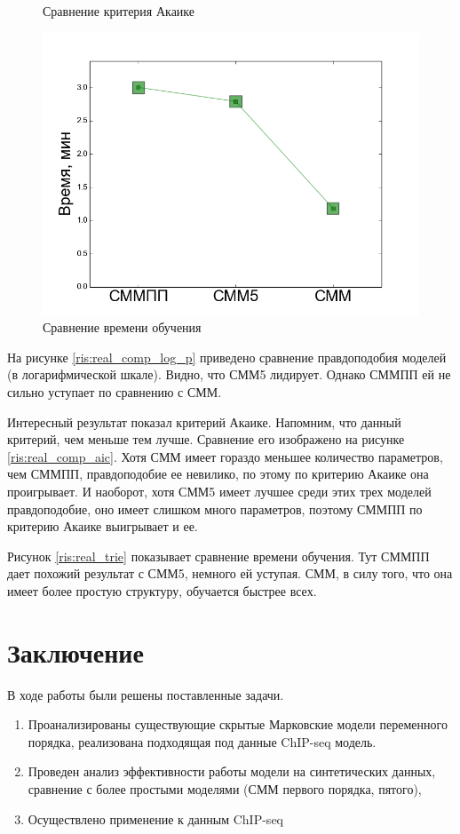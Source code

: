 \documentclass{matmex-diploma-custom}
\begin{document}
\begin{figure}[h!]
\begin{minipage}[b]{0.32 \textwidth}
	\centering
	\caption{ Сравнение критерия Акаике }
	\label{ris:real_comp_aic}
\end{minipage}
\hfill
\begin{minipage}[b]{0.32 \textwidth}
	\includegraphics[scale=0.28]{img/real/time.png}
	\centering
	\caption{ Сравнение времени обучения }
	\label{ris:real_comp_time}
\end{minipage}
\end{figure}

На рисунке \ref{ris:real_comp_log_p} приведено сравнение правдоподобия моделей (в логарифмической шкале). Видно, что СММ5 лидирует. Однако СММПП ей не сильно уступает по сравнению с СММ.

Интересный результат показал критерий Акаике. Напомним, что данный критерий, чем меньше тем лучше. Сравнение его изображено на рисунке \ref{ris:real_comp_aic}.
Хотя СММ имеет гораздо меньшее количество параметров, чем СММПП, правдоподобие ее невилико, по этому по критерию Акаике она проигрывает. И наоборот, хотя СММ5 имеет лучшее среди этих трех моделей правдоподобие, оно имеет слишком много параметров, поэтому СММПП по критерию Акаике выигрывает и ее.

Рисунок \ref{ris:real_trie} показывает сравнение времени обучения. Тут СММПП дает похожий результат с СММ5, немного ей уступая. СММ, в силу того, что она имеет более простую структуру, обучается быстрее всех.


\section*{Заключение}
В ходе работы были решены поставленные задачи.
\begin{enumerate}
\item
Проанализированы существующие скрытые Марковские
модели переменного порядка, реализована подходящая под данные ChIP-seq модель.
\item
Проведен анализ эффективности работы модели на
синтетических данных, сравнение с более простыми
моделями (СММ первого порядка, пятого), 
\item
Осуществлено применение к
данным ChIP-seq
\end{enumerate}






\end{document}
